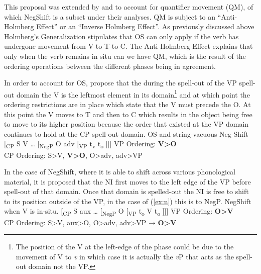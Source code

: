 \documentclass[12pt, letterpaper]{article}
\begin{document}
This proposal was extended by \citet{foxCyclicLinearizationSyntactic2005} and \citet{engelsMicrovariationObjectPositions2011,engelsScandinavianNegativeIndefinites2012} to account for quantifier movement (QM), of which NegShift is a subset under their analyses. QM is subject to an ``Anti-Holmberg Effect'' or an ``Inverse Holmberg Effect''. As previously discussed above Holmberg's Generalization stipulates that OS can only apply if the verb has undergone movement from V-to-T-to-C. The Anti-Holmberg Effect explains that only when the verb remains in situ can we have QM, which is the result of the ordering operations between the different phases being in agreement. 

In order to account for OS, \citeauthor{foxCyclicLinearizationSyntactic2005} propose that the during the spell-out of the VP spell-out domain the V is the leftmost element in its domain\footnote{The position of the V at the left-edge of the phase could be due to the movement of V to \textit{v} in which case it is actually the \textit{v}P that acts as the spell-out domain not the VP.} and at which point the ordering restrictions are in place which state that the V must precede the O. At this point the V moves to T and then to C which results in the object being free to move to its higher position because the order that existed at the VP domain continues to hold at the CP spell-out domain. 
\ea OS and string-vacuous Neg-Shift
\vspace{6pt}
 	\ea {}[\textsubscript{CP} S V … [\textsubscript{NegP} O adv [\textsubscript{VP} t\textsubscript{v} t\textsubscript{o} ]]]
	\vspace{6pt}
	\ex VP Ordering: \textbf{V>O}\\
		CP Ordering: S>V, \textbf{V>O}, O>adv, adv>VP
	\z
\z

In the case of NegShift, where it is able to shift across various phonological material, it is proposed that the NI first moves to the left edge of the VP before spell-out of that domain. Once that domain is spelled-out the NI is free to shift to its position outside of the VP, in the case of (\ref{ex:n}) this is to NegP.
	\ea NegShift when V is in-situ. \label{ex:n}
	\vspace{6pt}
		\ea {}[\textsubscript{CP} S aux … [\textsubscript{NegP} O [\textsubscript{VP} t\textsubscript{o}  V t\textsubscript{o} ]]]
		\ex VP Ordering: \textbf{O>V}\\
		CP Ordering: S>V, aux>O, O>adv, adv>VP → \textbf{O>V}
		\z 
	\z
\end{document}
